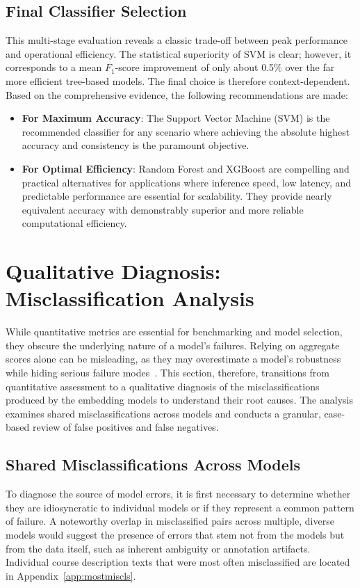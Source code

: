 \subsection{Final Classifier Selection}\label{ch:4.5.4}
This multi-stage evaluation reveals a classic trade-off between peak performance and operational efficiency. The statistical superiority of SVM is clear; however, it corresponds to a mean \(F_1\)-score improvement of only about 0.5\% over the far more efficient tree-based models. The final choice is therefore context-dependent. Based on the comprehensive evidence, the following recommendations are made:
\begin{itemize}
    \item \textbf{For Maximum Accuracy}: The Support Vector Machine (SVM) is the recommended classifier for any scenario where achieving the absolute highest accuracy and consistency is the paramount objective.
    \item \textbf{For Optimal Efficiency}: Random Forest and XGBoost are compelling and practical alternatives for applications where inference speed, low latency, and predictable performance are essential for scalability. They provide nearly equivalent accuracy with demonstrably superior and more reliable computational efficiency.
\end{itemize}

\section{Qualitative Diagnosis: Misclassification Analysis}\label{ch:4.6}
While quantitative metrics are essential for benchmarking and model selection, they obscure the underlying nature of a model's failures. Relying on aggregate scores alone can be misleading, as they may overestimate a model's robustness while hiding serious failure modes~\cite{gauthier2022}. This section, therefore, transitions from quantitative assessment to a qualitative diagnosis of the misclassifications produced by the embedding models to understand their root causes. The analysis examines shared misclassifications across models and conducts a granular, case-based review of false positives and false negatives.

\subsection{Shared Misclassifications Across Models}\label{ch:4.6.1}
To diagnose the source of model errors, it is first necessary to determine whether they are idiosyncratic to individual models or if they represent a common pattern of failure. A noteworthy overlap in misclassified pairs across multiple, diverse models would suggest the presence of errors that stem not from the models but from the data itself, such as inherent ambiguity or annotation artifacts.  Individual course description texts that were most often misclassified are located in Appendix~\ref{app:mostmiscls}.

